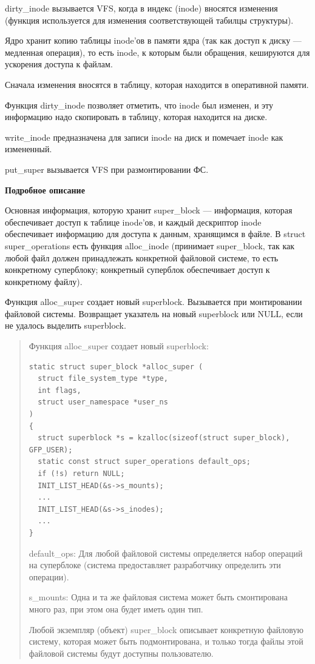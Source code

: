 dirty\_inode вызывается VFS, когда в индекс (inode) вносятся изменения (функция используется для изменения соответствующей табилцы структуры).

Ядро хранит копию таблицы inode'ов в памяти ядра (так как доступ к диску — медленная операция), то есть inode, к которым были обращения, кешируются для ускорения доступа к файлам.

Сначала изменения вносятся в таблицу, которая находится в оперативной памяти.

Функция dirty\_inode позволяет отметить, что inode был изменен, и эту информацию надо скопировать в таблицу, которая находится на диске.

write\_inode предназначена для записи inode на диск и помечает inode как измененный.

put\_super вызывается VFS при размонтировании ФС.

\textbf{Подробное описание}

Основная информация, которую хранит super\_block — информация, которая обеспечивает доступ к таблице inode'ов, и каждый дескриптор inode обеспечивает информацию для доступа к данным, хранящимся в файле. В struct super\_operations есть функция alloc\_inode (принимает super\_block, так как любой файл должен принадлежать конкретной файловой системе, то есть конкретному суперблоку; конкретный суперблок обеспечивает доступ к конкретному файлу).

Функция alloc\_super создает новый superblock. Вызывается при монтировании файловой системы. Возвращает указатель на новый superblock или NULL, если не удалось выделить superblock.

\begin{quote}

Функция alloc\_super создает новый superblock:

\begin{lstlisting}
static struct super_block *alloc_super (
  struct file_system_type *type,
  int flags,
  struct user_namespace *user_ns
)
{
  struct superblock *s = kzalloc(sizeof(struct super_block), GFP_USER);
  static const struct super_operations default_ops;
  if (!s) return NULL;
  INIT_LIST_HEAD(&s->s_mounts);
  ...
  INIT_LIST_HEAD(&s->s_inodes);
  ...
}
\end{lstlisting}

default\_ops: Для любой файловой системы определяется набор операций на суперблоке (система предоставляет разработчику определить эти операции).

s\_mounts: Одна и та же файловая система может быть смонтирована много раз, при этом она будет иметь один тип.

Любой экземпляр (объект) super\_block описывает конкретную файловую систему, которая может быть подмонтирована, и только тогда файлы этой файловой системы будут доступны пользователю.
\end{quote}

